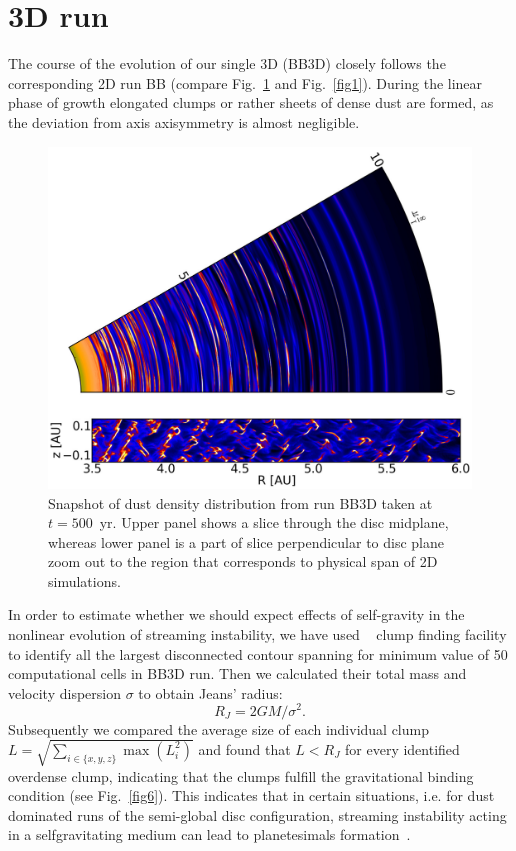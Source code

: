 \section{3D run}
The course of the evolution of our single 3D (BB3D) closely follows the
corresponding 2D run BB (compare Fig.~\ref{fig5} and Fig.~\ref{fig1}). During
the linear phase of growth elongated clumps or rather sheets of dense dust are
formed, as the deviation from axis axisymmetry is almost negligible.
%
\begin{figure}
   \includegraphics[width=0.98\linewidth]{figures/fig5}
   \caption{Snapshot of dust density distribution from run BB3D taken at
   $t=500$~yr. Upper panel shows a slice through the disc midplane, whereas lower
   panel is a part of slice perpendicular to disc plane zoom out to the region
   that corresponds to physical span of 2D simulations.}
   \label{fig5}
\end{figure}
In order to estimate whether we should expect effects of self-gravity  in the
nonlinear evolution of streaming instability, we have used \yt{}~\citep{yt} clump
finding facility to identify all the largest disconnected contour spanning for
minimum value of 50 computational cells in BB3D run. Then we calculated their
total mass and velocity dispersion $\sigma$ to obtain Jeans' radius:
%
\begin{equation}
   R_J = 2 GM / \sigma^2.
\end{equation}
Subsequently we compared the average size of each individual clump $L =
\sqrt{\sum_{i\in{\{x,y,z\}}} \max (L_i^2)}$ and found that $L < R_J$ for every
identified overdense clump, indicating that the clumps fulfill the gravitational
binding condition (see Fig.~\ref{fig6}). This indicates that in certain
situations, i.e. for dust dominated runs of the semi-global disc configuration,
streaming instability acting in a selfgravitating medium can lead to planetesimals
formation~\citep{J07}.

